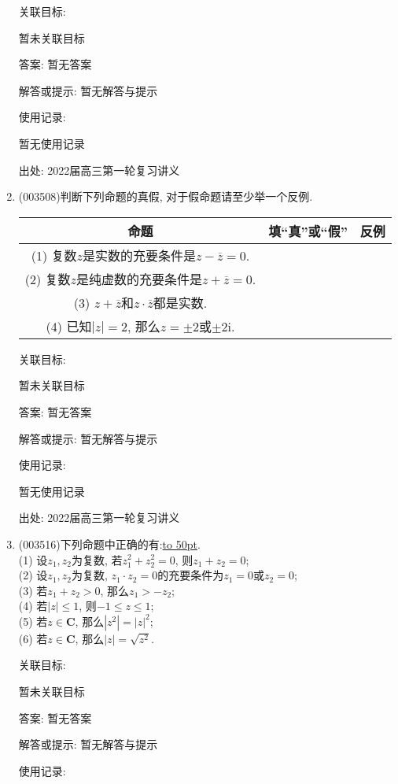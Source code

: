 \documentclass[10pt,a4paper]{article}
\newcommand{\blank}[1]{\underline{\hbox to #1pt{}}}
\begin{document}
\begin{enumerate}[1.]
关联目标:

暂未关联目标

答案: 暂无答案

解答或提示: 暂无解答与提示

使用记录:

暂无使用记录


出处: 2022届高三第一轮复习讲义
\item { (003508)}判断下列命题的真假, 对于假命题请至少举一个反例.
\begin{center}
    \begin{tabular}{|c|c|p{}<{\centering}|}
        \hline
        命题 & 填``真''或``假'' & 反例\\ \hline
        (1) 复数$z$是实数的充要条件是$z-\overline z=0$.	& & \\ \hline
        (2) 复数$z$是纯虚数的充要条件是$z+\overline z=0$. & & \\ \hline
        (3) $z+\overline{z}$和$z\cdot \overline{z}$都是实数. & & \\ \hline
        (4) 已知$|z|=2$, 那么$z=\pm 2$或$\pm 2\mathrm{i}$. & & \\ \hline
    \end{tabular}
\end{center}


关联目标:

暂未关联目标

答案: 暂无答案

解答或提示: 暂无解答与提示

使用记录:

暂无使用记录


出处: 2022届高三第一轮复习讲义
\item { (003516)}下列命题中正确的有:\blank{50}.\\
(1) 设$z_1,z_2$为复数, 若$z_1^2+z_2^2=0$, 则$z_1+z_2=0$;\\
(2) 设$z_1,z_2$为复数, $z_1\cdot z_2=0$的充要条件为$z_1=0$或$z_2=0$;\\
(3) 若$z_1+z_2>0$, 那么$z_1>-z_2$;\\
(4) 若$|z|\le 1$, 则$-1\le z\le 1$;\\
(5) 若$z\in \mathbf{C}$, 那么$|z^2|=|z|^2$;\\
(6) 若$z\in \mathbf{C}$, 那么$|z|=\sqrt{z^2}$.


关联目标:

暂未关联目标

答案: 暂无答案

解答或提示: 暂无解答与提示

使用记录:


\end{enumerate}
\end{document}
